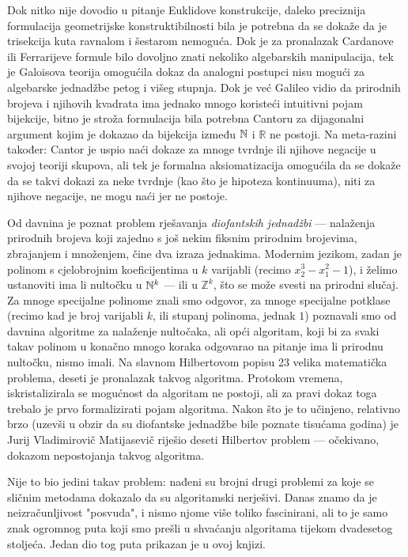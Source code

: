 Dok nitko nije dovodio u pitanje Euklidove konstrukcije, daleko preciznija formulacija geometrijske konstruktibilnosti bila je potrebna da se dokaže da je trisekcija kuta ravnalom i šestarom nemoguća. Dok je za pronalazak Cardanove ili Ferrarijeve formule bilo dovoljno znati nekoliko algebarskih manipulacija, tek je Galoisova teorija omogućila dokaz da analogni postupci nisu mogući za algebarske jednadžbe petog i višeg stupnja. Dok je već Galileo vidio da prirodnih brojeva i njihovih kvadrata ima jednako mnogo koristeći intuitivni pojam bijekcije, bitno je stroža formulacija bila potrebna Cantoru za dijagonalni argument kojim je dokazao da bijekcija između ${\mathbb N}$ i $\mathbb R$ ne postoji. Na meta-razini također: Cantor je uspio naći dokaze za mnoge tvrdnje ili njihove negacije u svojoj teoriji skupova, ali tek je formalna aksiomatizacija omogućila da se dokaže da se takvi dokazi za neke tvrdnje (kao što je hipoteza kontinuuma), niti za njihove negacije, ne mogu naći jer ne postoje.

Od davnina je poznat problem rješavanja \emph{diofantskih jednadžbi} --- nalaženja prirodnih brojeva koji zajedno s još nekim fiksnim prirodnim brojevima, zbrajanjem i množenjem, čine dva izraza jednakima. Modernim jezikom, zadan je polinom s cjelobrojnim koeficijentima u $k$ varijabli (recimo $x_2^3-x_1^2-1$), i želimo ustanoviti ima li nultočku u ${\mathbb N}^k$ --- ili u $\mathbb Z^k$, što se može svesti na prirodni slučaj. Za mnoge specijalne polinome znali smo odgovor, za mnoge specijalne potklase (recimo kad je broj varijabli $k$, ili stupanj polinoma, jednak $1$) poznavali smo od davnina algoritme za nalaženje nultočaka, ali opći algoritam, koji bi za svaki takav polinom u konačno mnogo koraka odgovarao na pitanje ima li prirodnu nultočku, nismo imali. Na slavnom Hilbertovom popisu 23 velika matematička problema, deseti je pronalazak takvog algoritma. Protokom vremena, iskristalizirala se mogućnost da algoritam ne postoji, ali za pravi dokaz toga trebalo je prvo formalizirati pojam algoritma. Nakon što je to učinjeno, relativno brzo (uzevši u obzir da su diofantske jednadžbe bile poznate tisućama godina) je Jurij Vladimirovič Matijasevič riješio deseti Hilbertov problem --- očekivano, dokazom nepostojanja takvog algoritma.

Nije to bio jedini takav problem: nađeni su brojni drugi problemi za koje se sličnim metodama dokazalo da su algoritamski nerješivi. Danas znamo da je neizračunljivost "posvuda", i nismo njome više toliko fascinirani, ali to je samo znak ogromnog puta koji smo prešli u shvaćanju algoritama tijekom dvadesetog stoljeća. Jedan dio tog puta prikazan je u ovoj knjizi.

